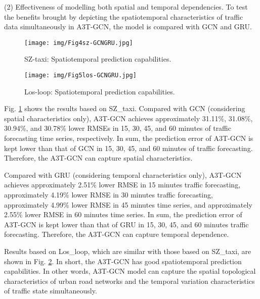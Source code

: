 \documentclass[10pt,journal,compsoc]{IEEEtran}
\begin{document}
(2) Effectiveness of modelling both spatial and temporal dependencies. To test the benefits brought by depicting the spatiotemporal characteristics of traffic data simultaneously in A3T-GCN, the model is compared with GCN and GRU.

\begin{figure}[t]
\begin{center}
  \texttt{[image: img/Fig4sz-GCNGRU.jpg]}
  \end{center}
  \caption{ SZ-taxi: Spatiotemporal prediction capabilities.}
\label{fig:4}
\end{figure}

\begin{figure}[t]
\begin{center}
  \texttt{[image: img/Fig5los-GCNGRU.jpg]}
  \end{center}
  \caption{Los-loop: Spatiotemporal prediction capabilities.}
\label{fig:5}
\end{figure}

\par Fig. \ref{fig:4} shows the results based on SZ\_taxi. Compared with GCN (considering spatial characteristics only), A3T-GCN achieves approximately 31.11\%, 31.08\%, 30.94\%, and 30.78\% lower RMSEs in 15, 30, 45, and 60 minutes of traffic forecasting time series, respectively. In sum, the prediction error of A3T-GCN is kept lower than that of GCN in 15, 30, 45, and 60 minutes of traffic forecasting. Therefore, the A3T-GCN can capture spatial characteristics.
\par Compared with GRU (considering temporal characteristics only), A3T-GCN achieves approximately 2.51\% lower RMSE in 15 minutes traffic forecasting, approximately 4.19\% lower RMSE in 30 minutes traffic forecasting, approximately 4.99\% lower RMSE in 45 minutes time series, and approximately 2.55\% lower RMSE in 60 minutes time series. In sum, the prediction error of A3T-GCN is kept lower than that of GRU in 15, 30, 45, and 60 minutes traffic forecasting. Therefore, the A3T-GCN can capture temporal dependence.
\par Results based on Los\_loop, which are similar with those based on SZ\_taxi, are shown in Fig. \ref{fig:5}. In short, the A3T-GCN has good spatiotemporal prediction capabilities. In other words, A3T-GCN model can capture the spatial topological characteristics of urban road networks and the temporal variation characteristics of traffic state simultaneously.
\end{document}
